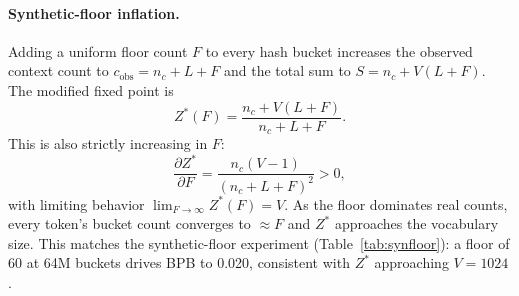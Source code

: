 \documentclass[11pt]{article}
\begin{document}
\paragraph{Synthetic-floor inflation.}
Adding a uniform floor count $F$ to every hash bucket increases the observed context count to $c_{\text{obs}} = n_c + L + F$ and the total sum to $S = n_c + V(L + F)$. The modified fixed point is
\[
Z^*(F) = \frac{n_c + V(L + F)}{n_c + L + F}.
\]
This is also strictly increasing in $F$:
\[
\frac{\partial Z^*}{\partial F} = \frac{n_c(V - 1)}{(n_c + L + F)^2} > 0,
\]
with limiting behavior $\lim_{F \to \infty} Z^*(F) = V$. As the floor dominates real counts, every token's bucket count converges to $\approx F$ and $Z^*$ approaches the vocabulary size. This matches the synthetic-floor experiment (Table~\ref{tab:synfloor}): a floor of 60 at 64M buckets drives BPB to 0.020, consistent with $Z^*$ approaching $V = 1024$.
\end{document}
